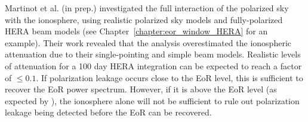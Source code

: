 {\color{red}Martinot et al. (in prep.)} investigated the full interaction of the polarized sky with the ionosphere, using realistic polarized sky models and fully-polarized HERA beam models (see Chapter~\ref{chapter:eor_window_HERA} for an example). Their work revealed that the \cite{Moore.17} analysis overestimated the ionospheric attenuation due to their single-pointing and simple beam models. Realistic levels of attenuation for a 100 day HERA integration can be expected to reach a factor of $\leqslant 0.1$. If polarization leakage occurs close to the EoR level, this is sufficient to recover the EoR power spectrum. However, if it is above the EoR level (as expected by \citealt{Nunhokee.17}), the ionosphere alone will not be sufficient to rule out polarization leakage being detected before the EoR can be recovered.
